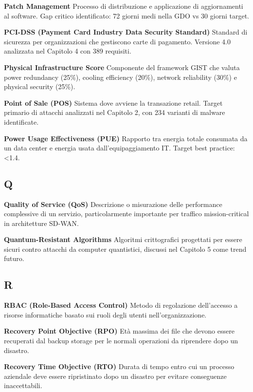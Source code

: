 \documentclass{report}
\begin{document}
\textbf{Patch Management} Processo di distribuzione e applicazione di
aggiornamenti al software. Gap critico identificato: 72 giorni medi
nella GDO vs 30 giorni target.

\textbf{PCI-DSS (Payment Card Industry Data Security Standard)} Standard
di sicurezza per organizzazioni che gestiscono carte di pagamento.
Versione 4.0 analizzata nel Capitolo 4 con 389 requisiti.

\textbf{Physical Infrastructure Score} Componente del framework GIST che
valuta power redundancy (25\%), cooling efficiency (20\%), network
reliability (30\%) e physical security (25\%).

\textbf{Point of Sale (POS)} Sistema dove avviene la transazione retail.
Target primario di attacchi analizzati nel Capitolo 2, con 234 varianti
di malware identificate.

\textbf{Power Usage Effectiveness (PUE)} Rapporto tra energia totale
consumata da un data center e energia usata dall'equipaggiamento IT.
Target best practice: \textless1.4.

\subsection{Q}\label{q}

\textbf{Quality of Service (QoS)} Descrizione o misurazione delle
performance complessive di un servizio, particolarmente importante per
traffico mission-critical in architetture SD-WAN.

\textbf{Quantum-Resistant Algorithms} Algoritmi crittografici progettati
per essere sicuri contro attacchi da computer quantistici, discussi nel
Capitolo 5 come trend futuro.

\subsection{R}\label{r}

\textbf{RBAC (Role-Based Access Control)} Metodo di regolazione
dell'accesso a risorse informatiche basato sui ruoli degli utenti
nell'organizzazione.

\textbf{Recovery Point Objective (RPO)} Età massima dei file che devono
essere recuperati dal backup storage per le normali operazioni da
riprendere dopo un disastro.

\textbf{Recovery Time Objective (RTO)} Durata di tempo entro cui un
processo aziendale deve essere ripristinato dopo un disastro per evitare
conseguenze inaccettabili.
\end{document}
